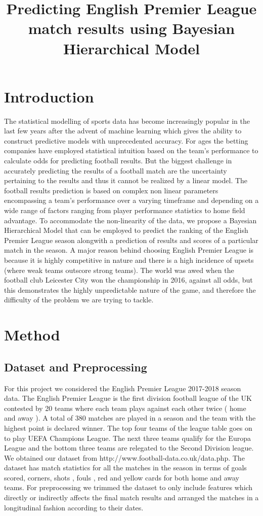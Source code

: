 \documentclass{article}
\title{Predicting English Premier League match results using Bayesian Hierarchical Model}
\begin{document}
\maketitle

\section{Introduction}
The statistical modelling of sports data has become increasingly popular in the last few years after the advent of machine learning which gives the ability to construct predictive models with unprecedented accuracy. For ages the betting companies have employed statistical intuition based on the team’s performance to calculate odds for predicting football results. But the biggest challenge in accurately predicting the results of a football match are the uncertainty pertaining to the results and thus it cannot be realized by a linear model. The football results prediction is based on complex non linear parameters encompassing a team’s performance over a varying timeframe and depending on a wide range of factors ranging from player performance statistics to home field advantage. To accommodate the non-linearity of the data, we propose a Bayesian Hierarchical Model that can be employed to predict the ranking of the English Premier League season alongwith a prediction of results and scores of a particular match in the season. A major reason behind choosing English Premier League is because it is highly competitive in nature and there is a high incidence of upsets (where weak teams outscore strong teams). The world was awed when the football club Leicester City won the championship in 2016, against all odds, but this demonstrates the highly unpredictable nature of the game, and therefore the difficulty of the problem we are trying to tackle.

\section{Method}

\subsection{Dataset and Preprocessing}
For this project we considered the English Premier League 2017-2018 season data. The English Premier League is the first division football league of the UK contested by 20 teams where each team plays against each other twice ( home and away ). A total of 380 matches are played in a season and the team with the highest point is declared winner. The top four teams of the league table goes on to play UEFA Champions League. The next three teams qualify for the Europa League and the bottom three teams are relegated to the Second Division league. We obtained our dataset from http://www.football-data.co.uk/data.php. The dataset has match statistics for all the matches in the season in terms of goals scored, corners, shots , fouls , red and yellow cards for both home and away teams. For preprocessing we trimmed the dataset to only include features which directly or indirectly affects the final match results and arranged the matches in a longitudinal fashion according to their dates.
\end{document}
